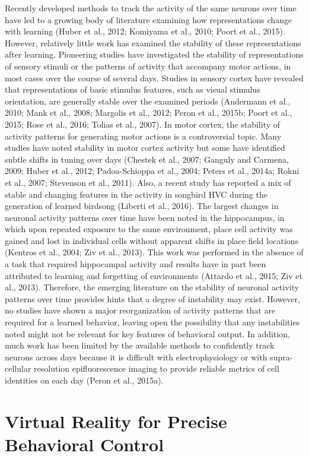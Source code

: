 Recently developed methods to track the activity of the same neurons over time have led to a growing body of literature examining how representations change with learning (Huber et al., 2012; Komiyama et al., 2010; Poort et al., 2015). However, relatively little work has examined the stability of these representations after learning. Pioneering studies have investigated the stability of representations of sensory stimuli or the patterns of activity that accompany motor actions, in most cases over the course of several days. Studies in sensory cortex have revealed that representations of basic stimulus features, such as visual stimulus orientation, are generally stable over the examined periods (Andermann et al., 2010; Mank et al., 2008; Margolis et al., 2012; Peron et al., 2015b; Poort et al., 2015; Rose et al., 2016; Tolias et al., 2007). In motor cortex, the stability of activity patterns for generating motor actions is a controversial topic. Many studies have noted stability in motor cortex activity but some have identified subtle shifts in tuning over days (Chestek et al., 2007; Ganguly and Carmena, 2009; Huber et al., 2012; Padoa-Schioppa et al., 2004; Peters et al., 2014a; Rokni et al., 2007; Stevenson et al., 2011). Also, a recent study has reported a mix of stable and changing features in the activity in songbird HVC during the generation of learned birdsong (Liberti et al., 2016). The largest changes in neuronal activity patterns over time have been noted in the hippocampus, in which upon repeated exposure to the same environment, place cell activity was gained and lost in individual cells without apparent shifts in place field locations (Kentros et al., 2004; Ziv et al., 2013). This work was performed in the absence of a task that required hippocampal activity and results have in part been attributed to learning and forgetting of environments (Attardo et al., 2015; Ziv et al., 2013). Therefore, the emerging literature on the stability of neuronal activity patterns over time provides hints that a degree of instability may exist. However, no studies have shown a major reorganization of activity patterns that are required for a learned behavior, leaving open the possibility that any instabilities noted might not be relevant for key features of behavioral output. In addition, much work has been limited by the available methods to confidently track neurons across days because it is difficult with electrophysiology or with supra-cellular resolution epifluorescence imaging to provide reliable metrics of cell identities on each day (Peron et al., 2015a). 

\section{Virtual Reality for Precise Behavioral Control} \label{intro:vr}
